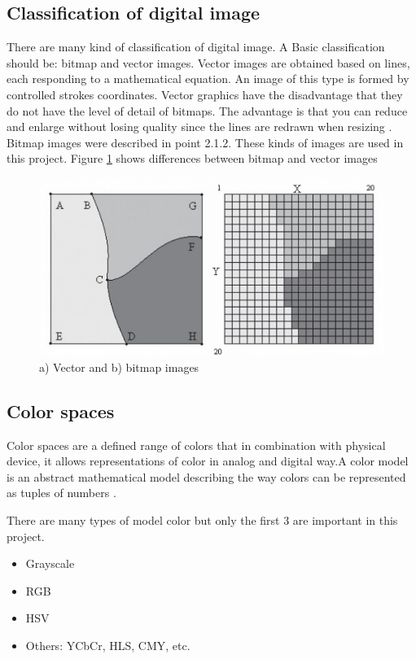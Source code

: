 \subsection{Classification of digital image}
There are many kind of classification of digital image. A Basic classification should be: bitmap and vector images. Vector images are obtained based on lines, each responding to a mathematical equation. An image of this type is formed by controlled strokes coordinates. Vector graphics have the disadvantage that they do not have the level of detail of bitmaps. The advantage is that you can reduce and enlarge without losing quality since the lines are redrawn when resizing \cite{dip1}.
Bitmap images were described in point 2.1.2. These kinds of images are used in this project. Figure \ref{fig:vectorAndBitmap} shows differences between bitmap and vector images

\begin{figure}
  \includegraphics[width=\linewidth]{images/ch2/vectorAndBitmap.jpg}
  \caption{a) Vector and b) bitmap images}
  \label{fig:vectorAndBitmap}
\end{figure}

\subsection{Color spaces}
Color spaces are a defined range of colors that in combination with physical device, it allows representations of color in analog and digital way.A color model is an abstract mathematical model describing the way colors can be represented as tuples of numbers \cite{dip3}.

There are many types of model color but only the first 3 are important in this project.

\begin{itemize}
	\item Grayscale
	\item RGB
	\item HSV
	\item Others: YCbCr, HLS, CMY, etc.
\end{itemize}

